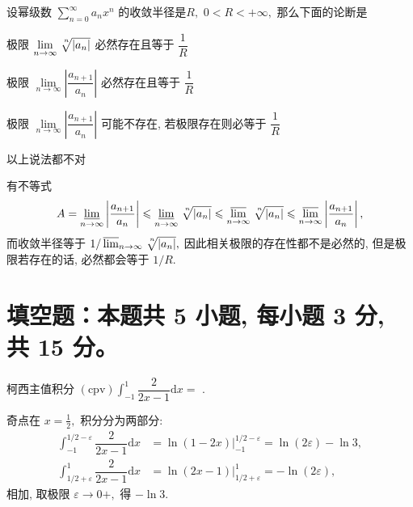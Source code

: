 \begin{question}
设幂级数 $\sum\limits_{n=0}^\infty a_n x^n$ 的收敛半径是$R,$ $0 < R < +\infty,$ 那么下面的论断是 \paren[C]

\begin{choices}
\item 极限 $\lim\limits_{n\to\infty} \nroot[n]{\lvert a_n \rvert}$ 必然存在且等于 $\dfrac{1}{R}$
\item 极限 $\lim\limits_{n\to\infty} \left\lvert \dfrac{a_{n+1}}{a_n} \right\rvert$ 必然存在且等于 $\dfrac{1}{R}$
\item 极限 $\lim\limits_{n\to\infty} \left\lvert \dfrac{a_{n+1}}{a_n} \right\rvert$ 可能不存在, 若极限存在则必等于 $\dfrac{1}{R}$
\item 以上说法都不对
\end{choices}
\end{question}

\begin{solution}
有不等式
$$A = \varliminf_{n\to\infty} \left\lvert \dfrac{a_{n+1}}{a_n} \right\rvert \leqslant \varliminf_{n\to\infty} \nroot[n]{\lvert a_n \rvert} \leqslant \varlimsup_{n\to\infty} \nroot[n]{\lvert a_n \rvert} \leqslant \varlimsup_{n\to\infty}  \left\lvert \dfrac{a_{n+1}}{a_n} \right\rvert,$$
而收敛半径等于 $1 / \varlimsup_{n\to\infty} \nroot[n]{\lvert a_n \rvert},$ 因此相关极限的存在性都不是必然的, 但是极限若存在的话, 必然都会等于 $1 / R.$
\end{solution}


\section{填空题：本题共 5 小题, 每小题 3 分, 共 15 分。}



\begin{question}
柯西主值积分 $\displaystyle (\text{cpv}) \int_{-1}^1 \dfrac{2}{2x-1} \mathrm{d}x =$ \fillin[$-\ln 3$].
\end{question}

\begin{solution}
奇点在 $x = \frac{1}{2},$ 积分分为两部分:
\begin{align*}
\int_{-1}^{1/2 - \varepsilon} \dfrac{2}{2x-1} \mathrm{d}x & = \ln (1 - 2x) \bigg|_{-1}^{1/2 - \varepsilon} = \ln(2\varepsilon) - \ln 3, \\
\int_{1/2 + \varepsilon}^1 \dfrac{2}{2x-1} \mathrm{d}x & = \ln (2x - 1) \bigg|_{1/2 + \varepsilon}^1 = -\ln(2\varepsilon),
\end{align*}
相加, 取极限 $\varepsilon \to 0+,$ 得 $-\ln 3.$
\end{solution}

